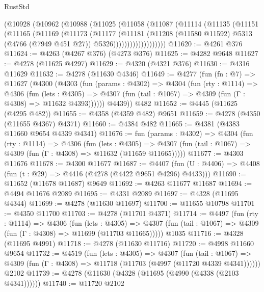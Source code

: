 \begin{lexlean}{RustStd}
\begin{coremodule}
            (@10928
              (@10962
                (@10988
                  (@11025
                    (@11058
                      (@11087
                        (@11114
                          (@11135
                            (@11151
                              (@11165
                                (@11169
                                  (@11173
                                    (@11177
                                      (@11181
                                        (@11208
                                          (@11580 @11592)
                                          @5313
                                          (@4766 (@7949 @451 @27))
                                          @5326)))))))))))))))))))
@11620 := @4261 @376
@11624 := @4263 (@4267 @376) (@4273 @376)
@11625 := @4282 @9648
@11627 := @4278 (@11625 @4297)
@11629 := @4320 (@4321 @376)
@11630 := @4316 @11629
@11632 := @4278 (@11630 @4346)
@11649 := @4277
    (fun (fn : @7) =>
    @11627
      (@4300
        (@4303
          (fun (params : @4302) =>
          @4304
            (fun (rty : @1114) =>
            @4306
              (fun (lets : @4305) =>
              @4307 (fun (tail : @1067) => @4309 (fun (Γ : @4308) => @11632 @4393))))))
        @4439))
    @482
@11652 := @4445 (@11625 (@4295 @482))
@11655 := @4358 (@4359 @482) @9651
@11659 := @4278 (@4350 (@11655 @4367) @4371)
@11660 := @4384 @482
@11665 := @4381 (@4383 @11660 @9654 @4339 @4341)
@11676 := fun (params : @4302) =>
  @4304
    (fun (rty : @1114) =>
    @4306
      (fun (lets : @4305) =>
      @4307 (fun (tail : @1067) => @4309 (fun (Γ : @4308) => @11632 (@11659 @11665)))))
@11677 := @4303 @11676
@11678 := @4300 @11677
@11687 := @4407
    (fun (U : @4406) => @4408 (fun (t : @29) => @4416 (@4278 (@4422 @9651 @4296) @4433)))
@11690 := @11652 (@11678 @11687) @9649
@11692 := @4263 @11677 @11687
@11694 := @4494 @11676 @2089
@11695 := @4331 @2089
@11697 := @4328 (@11695 @4344)
@11699 := @4278 (@11630 @11697)
@11700 := @11655 @10798
@11701 := @4350 @11700
@11703 := @4278 (@11701 @4371)
@11714 := @4497
    (fun (rty : @1114) =>
    @4306
      (fun (lets : @4305) =>
      @4307 (fun (tail : @1067) => @4309 (fun (Γ : @4308) => @11699 (@11703 @11665)))))
    @1035
@11716 := @4328 (@11695 @4991)
@11718 := @4278 (@11630 @11716)
@11720 := @4998 @11660 @9654
@11732 := @4519
    (fun (lets : @4305) =>
    @4307
      (fun (tail : @1067) =>
      @4309 (fun (Γ : @4308) => @11718 (@11703 (@4997 (@11720 @4339 @4341))))))
    @2102
@11739 := @4278 (@11630 (@4328 (@11695 (@4990 (@4338 (@2103 @4341))))))
@11740 := @11720 @2102

\end{coremodule}
\end{lexlean}
